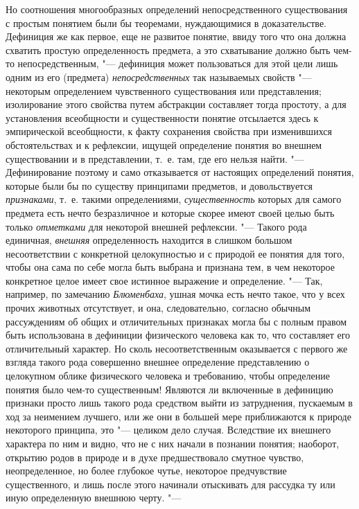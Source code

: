 Но соотношения многообразных определений непосредственного
существования с простым понятием были бы теоремами, нуждающимися в
доказательстве. Дефиниция же как первое, еще не развитое понятие, ввиду
того что она должна схватить простую определенность предмета, а это
схватывание должно быть чем-то непосредственным, "--- дефиниция
может пользоваться для этой цели лишь одним из его (предмета)
{\em непосредственных}
так называемых свойств "--- некоторым
определением чувственного существования или представления; изолирование
этого свойства путем абстракции составляет тогда простоту, а для
установления всеобщности и существенности понятие отсылается здесь к
эмпирической всеобщности, к факту сохранения свойства при изменившихся
обстоятельствах и к рефлексии, ищущей определение понятия во внешнем
существовании и в представлении, т.~е. там, где его нельзя найти. "---
Дефинирование поэтому и само отказывается от настоящих
определений понятия, которые были бы по существу принципами предметов, и
довольствуется {\em признаками},
т.~е. такими определениями,
{\em существенность}
которых для самого предмета есть нечто безразличное и которые
скорее имеют своей целью быть только
{\em отметками} для
некоторой внешней рефлексии. "--- Такого рода единичная,
{\em внешняя}
определенность находится в слишком большом несоответствии с
конкретной целокупностью и с природой ее понятия для того, чтобы она сама
по себе могла быть выбрана и признана тем, в чем некоторое конкретное целое
имеет свое истинное выражение и определение. "--- Так,
например, по замечанию
{\em Блюменбаха}, ушная
мочка есть нечто такое, что у всех прочих животных отсутствует, и она,
следовательно, согласно обычным рассуждениям об общих и
отличительных признаках могла бы с полным правом быть
использована в дефиниции физического человека как то, что составляет его
отличительный характер. Но сколь несоответственным оказывается с первого же
взгляда такого рода совершенно внешнее определение представлению о
целокупном облике физического человека и требованию, чтобы определение
понятия было чем-то существенным! Являются ли включенные в дефиницию
признаки просто лишь такого рода средством выйти из затруднения, пускаемым
в ход за неимением лучшего, или же они в большей мере приближаются к
природе некоторого принципа, это "--- целиком дело случая.
Вследствие их внешнего характера по ним и видно, что не с них начали в
познании понятия; наоборот, открытию родов в природе и в духе
предшествовало смутное чувство, неопределенное, но более глубокое чутье,
некоторое предчувствие существенного, и лишь после этого начинали
отыскивать для рассудка ту или иную определенную внешнюю черту. "---
